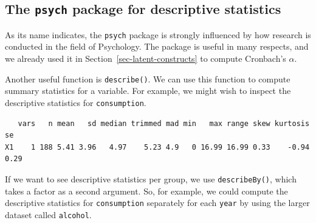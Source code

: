 \documentclass[
  letterpaper,
  DIV=11,
  numbers=noendperiod]{scrreprt}
\newenvironment{Shaded}{\begin{snugshade}}{\end{snugshade}}
\newcommand{\CommentTok}[1]{\textcolor[rgb]{0.37,0.37,0.37}{#1}}
\newcommand{\DecValTok}[1]{\textcolor[rgb]{0.68,0.00,0.00}{#1}}
\newcommand{\FunctionTok}[1]{\textcolor[rgb]{0.28,0.35,0.67}{#1}}
\newcommand{\NormalTok}[1]{\textcolor[rgb]{0.00,0.23,0.31}{#1}}
\newcommand{\OtherTok}[1]{\textcolor[rgb]{0.00,0.23,0.31}{#1}}
\newcommand{\SpecialCharTok}[1]{\textcolor[rgb]{0.37,0.37,0.37}{#1}}
\begin{document}
\subsection{\texorpdfstring{The \texttt{psych} package for descriptive
statistics}{The psych package for descriptive statistics}}\label{sec-psych-package}

As its name indicates, the \texttt{psych} package is strongly influenced
by how research is conducted in the field of Psychology. The package is
useful in many respects, and we already used it in
Section~\ref{sec-latent-constructs} to compute Cronbach's \(\alpha\).

Another useful function is \texttt{describe()}. We can use this function
to compute summary statistics for a variable. For example, we might wish
to inspect the descriptive statistics for \texttt{consumption}.

\begin{Shaded}
\end{Shaded}

\begin{verbatim}
   vars   n mean   sd median trimmed mad min   max range skew kurtosis   se
X1    1 188 5.41 3.96   4.97    5.23 4.9   0 16.99 16.99 0.33    -0.94 0.29
\end{verbatim}

If we want to see descriptive statistics per group, we use
\texttt{describeBy()}, which takes a factor as a second argument. So,
for example, we could compute the descriptive statistics for
\texttt{consumption} separately for each \texttt{year} by using the
larger dataset called \texttt{alcohol}.

\begin{Shaded}
\end{Shaded}
\end{document}

